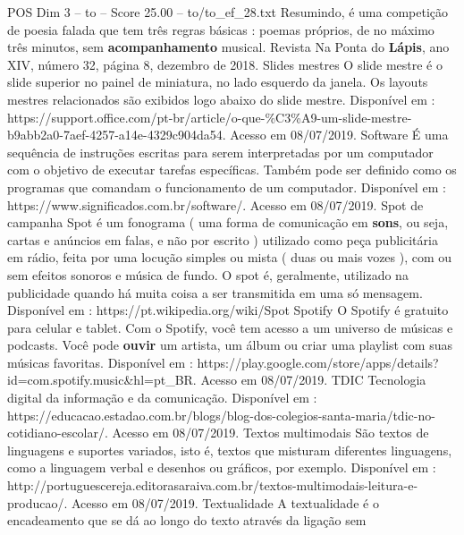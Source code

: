 \begin{textsample}{POS Dim 3 – to – Score 25.00 – to/to\_ef\_28.txt}
Resumindo, é uma competição de poesia falada que tem três regras básicas : poemas próprios, de no máximo três minutos, sem \textbf{acompanhamento} musical.
Revista Na Ponta do \textbf{Lápis}, ano XIV, número 32, página 8, dezembro de 2018.
Slides mestres O slide mestre é o slide superior no painel de miniatura, no lado esquerdo da janela.
Os layouts mestres relacionados são exibidos logo abaixo do slide mestre.
Disponível em : https://support.office.com/pt-br/article/o-que-\%C3\%A9-um-slide-mestre-b9abb2a0-7aef-4257-a14e-4329c904da54.
Acesso em 08/07/2019.
Software É uma sequência de instruções escritas para serem interpretadas por um computador com o objetivo de executar tarefas específicas.
Também pode ser definido como os programas que comandam o funcionamento de um computador.
Disponível em : https://www.significados.com.br/software/.
Acesso em 08/07/2019.
Spot de campanha Spot é um fonograma ( uma forma de comunicação em \textbf{sons}, ou seja, cartas e anúncios em falas, e não por escrito ) utilizado como peça publicitária em rádio, feita por uma locução simples ou mista ( duas ou mais vozes ), com ou sem efeitos sonoros e música de fundo.
O spot é, geralmente, utilizado na publicidade quando há muita coisa a ser transmitida em uma só mensagem.
Disponível em : https://pt.wikipedia.org/wiki/Spot Spotify O Spotify é gratuito para celular e tablet.
Com o Spotify, você tem acesso a um universo de músicas e podcasts.
Você pode \textbf{ouvir} um artista, um álbum ou criar uma playlist com suas músicas favoritas.
Disponível em : https://play.google.com/store/apps/details? id=com.spotify.music\&hl=pt\_BR.
Acesso em 08/07/2019.
TDIC Tecnologia digital da informação e da comunicação.
Disponível em : https://educacao.estadao.com.br/blogs/blog-dos-colegios-santa-maria/tdic-no-cotidiano-escolar/.
Acesso em 08/07/2019.
Textos multimodais São textos de linguagens e suportes variados, isto é, textos que misturam diferentes linguagens, como a linguagem verbal e desenhos ou gráficos, por exemplo.
Disponível em : http://portuguescereja.editorasaraiva.com.br/textos-multimodais-leitura-e-producao/.
Acesso em 08/07/2019.
Textualidade A textualidade é o encadeamento que se dá ao longo do texto através da ligação sem

\end{textsample}
